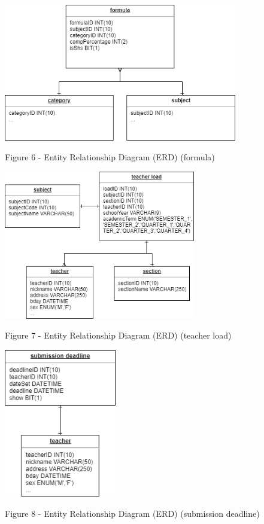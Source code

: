 \documentclass[11pt,a4paper,titlepage]{article}
\begin{document}
\vspace{1cm}
\begin{center}
    \includegraphics[height=6.0cm]{Formula.png}
\end{center}
\vspace{1cm}
\begin{center}
    Figure 6 - Entity Relationship Diagram (ERD) (formula)
\end{center}

\vspace{1cm}
\begin{center}
    \includegraphics[height=6.5cm]{Teacher-Load.png}
\end{center}
\vspace{1cm}
\begin{center}
    Figure 7 - Entity Relationship Diagram (ERD) (teacher load)
\end{center}

\vspace{1cm}
\begin{center}
    \includegraphics[height=6.5cm]{Submission-Deadline.png}
\end{center}
\vspace{1cm}
\begin{center}
    Figure 8 - Entity Relationship Diagram (ERD) (submission deadline)
\end{center}
\end{document}
